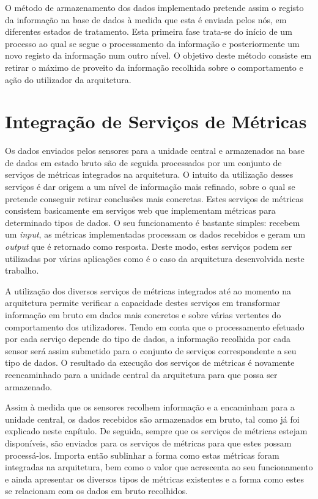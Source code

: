 O método de armazenamento dos dados implementado pretende assim o registo da informação na base de dados à medida que esta é enviada pelos nós, em diferentes estados de tratamento. Esta primeira fase trata-se do início de um processo ao qual se segue o processamento da informação e posteriormente um novo registo da informação num outro nível. O objetivo deste método consiste em retirar o máximo de proveito da informação recolhida sobre o comportamento e ação do utilizador da arquitetura. 



\section{Integração de Serviços de Métricas}

Os dados enviados pelos sensores para a unidade central e armazenados na base de dados em estado bruto são de seguida processados por um conjunto de serviços de métricas integrados na arquitetura. O intuito da utilização desses serviços é dar origem a um nível de informação mais refinado, sobre o qual se pretende conseguir retirar conclusões mais concretas. Estes serviços de métricas consistem basicamente em serviços web que implementam métricas para determinado tipos de dados. O seu funcionamento é bastante simples: recebem um \textit{input}, as métricas implementadas processam os dados recebidos e geram um \textit{output} que é retornado como resposta. Deste modo, estes serviços podem ser utilizadas por várias aplicações como é o caso da arquitetura desenvolvida neste trabalho.

A utilização dos diversos serviços de métricas integrados até ao momento na arquitetura permite verificar a capacidade destes serviços em transformar informação em bruto em dados mais concretos e sobre várias vertentes do comportamento dos utilizadores. Tendo em conta que o processamento efetuado por cada serviço depende do tipo de dados, a informação recolhida por cada sensor será assim submetido para o conjunto de serviços correspondente a seu tipo de dados. O resultado da execução dos serviços de métricas é novamente reencaminhado para a unidade central da arquitetura para que possa ser armazenado.

Assim à medida que os sensores recolhem informação e a encaminham para a unidade central, os dados recebidos são armazenados em bruto, tal como já foi explicado neste capítulo. De seguida, sempre que os serviços de métricas estejam disponíveis, são enviados para os serviços de métricas para que estes possam processá-los. Importa então sublinhar a forma como estas métricas foram integradas na arquitetura, bem como o valor que acrescenta ao seu funcionamento e ainda apresentar os diversos tipos de métricas existentes e a forma como estes se relacionam com os dados em bruto recolhidos.

